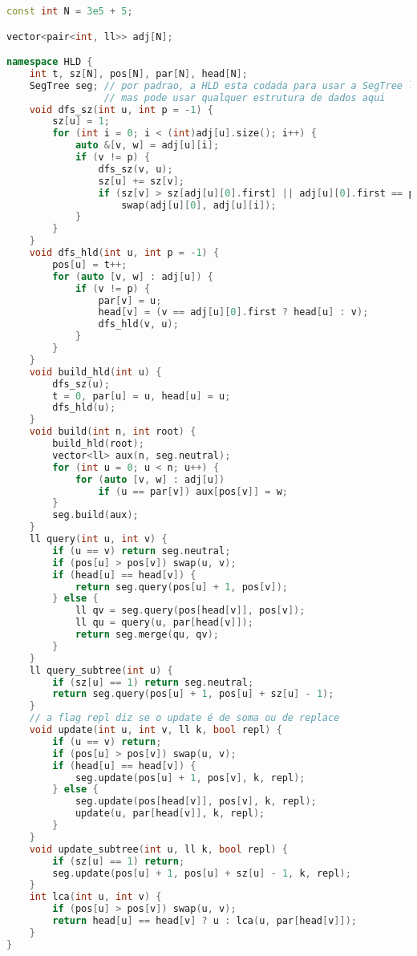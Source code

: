 \documentclass[10pt, a4paper, oneside]{book}
\begin{document}
\begin{lstlisting}[language=C++]
const int N = 3e5 + 5;

vector<pair<int, ll>> adj[N];

namespace HLD {
    int t, sz[N], pos[N], par[N], head[N];
    SegTree seg; // por padrao, a HLD esta codada para usar a SegTree lazy,
                 // mas pode usar qualquer estrutura de dados aqui
    void dfs_sz(int u, int p = -1) {
        sz[u] = 1;
        for (int i = 0; i < (int)adj[u].size(); i++) {
            auto &[v, w] = adj[u][i];
            if (v != p) {
                dfs_sz(v, u);
                sz[u] += sz[v];
                if (sz[v] > sz[adj[u][0].first] || adj[u][0].first == p)
                    swap(adj[u][0], adj[u][i]);
            }
        }
    }
    void dfs_hld(int u, int p = -1) {
        pos[u] = t++;
        for (auto [v, w] : adj[u]) {
            if (v != p) {
                par[v] = u;
                head[v] = (v == adj[u][0].first ? head[u] : v);
                dfs_hld(v, u);
            }
        }
    }
    void build_hld(int u) {
        dfs_sz(u);
        t = 0, par[u] = u, head[u] = u;
        dfs_hld(u);
    }
    void build(int n, int root) {
        build_hld(root);
        vector<ll> aux(n, seg.neutral);
        for (int u = 0; u < n; u++) {
            for (auto [v, w] : adj[u])
                if (u == par[v]) aux[pos[v]] = w;
        }
        seg.build(aux);
    }
    ll query(int u, int v) {
        if (u == v) return seg.neutral;
        if (pos[u] > pos[v]) swap(u, v);
        if (head[u] == head[v]) {
            return seg.query(pos[u] + 1, pos[v]);
        } else {
            ll qv = seg.query(pos[head[v]], pos[v]);
            ll qu = query(u, par[head[v]]);
            return seg.merge(qu, qv);
        }
    }
    ll query_subtree(int u) {
        if (sz[u] == 1) return seg.neutral;
        return seg.query(pos[u] + 1, pos[u] + sz[u] - 1);
    }
    // a flag repl diz se o update é de soma ou de replace
    void update(int u, int v, ll k, bool repl) {
        if (u == v) return;
        if (pos[u] > pos[v]) swap(u, v);
        if (head[u] == head[v]) {
            seg.update(pos[u] + 1, pos[v], k, repl);
        } else {
            seg.update(pos[head[v]], pos[v], k, repl);
            update(u, par[head[v]], k, repl);
        }
    }
    void update_subtree(int u, ll k, bool repl) {
        if (sz[u] == 1) return;
        seg.update(pos[u] + 1, pos[u] + sz[u] - 1, k, repl);
    }
    int lca(int u, int v) {
        if (pos[u] > pos[v]) swap(u, v);
        return head[u] == head[v] ? u : lca(u, par[head[v]]);
    }
}
\end{lstlisting}
\hfill
\end{document}
